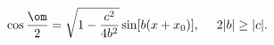 \begin{equation}                                        \label{eqomxc}
  \cos\frac\om2=\sqrt{1-\frac{c^2}{4b^2}}\sin[b(x+x_0)],~~~~2|b|\ge|c|.
\end{equation}

